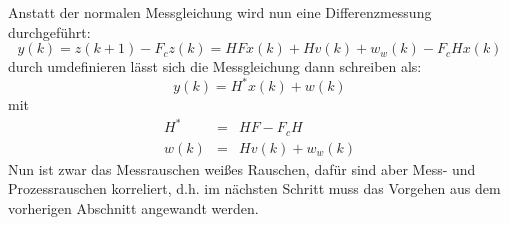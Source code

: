 Anstatt der normalen Messgleichung wird nun eine Differenzmessung durchgeführt:
\begin{equation*}
    y(k) = z(k+1) - F_c z(k) = HFx(k) + Hv(k) +w_w(k) -F_c H x(k)
\end{equation*}
durch umdefinieren lässt sich die Messgleichung dann schreiben als:
\begin{equation*}
    y(k) = H^* x(k) + w(k)
\end{equation*}
mit
\begin{eqnarray*}
    H^* &=& HF - F_c H \\
    w(k) &=& H v(k) + w_w(k) 
\end{eqnarray*}
Nun ist zwar das Messrauschen weißes Rauschen, dafür sind aber Mess- und Prozessrauschen korreliert, d.h. im nächsten
Schritt muss das Vorgehen aus dem vorherigen Abschnitt angewandt werden.
